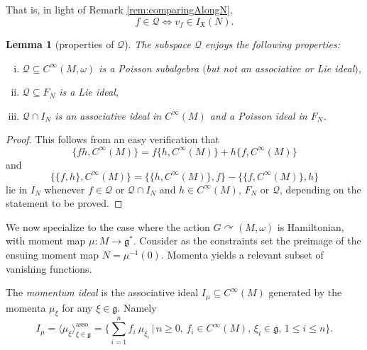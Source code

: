 \documentclass[pdftex]{sigma}
\numberwithin{equation}{section}
\newtheorem{Lemma}[Theorem]{Lemma}
\DeclareMathOperator{\action}{\curvearrowright}
\newcommand{\g}{\mathfrak{g}}
\newcommand{\X}{\mathfrak{X}}
\renewcommand{\subset}{\subseteq}
\begin{document}
That is, in light of Remark \ref{rem:comparingAlongN},
\[
	f \in \mathcal{Q} \iff v_f\in I_\X(N).
\]

\begin{Lemma}[properties of $\mathcal{Q}$]\label{lem:Qproperties}
	The subspace $\mathcal{Q}$ enjoys the following properties:
	\begin{enumerate}[i.]\itemsep=0pt
		\item[$(i)$] $\mathcal{Q}\subset C^\infty(M,\omega)$ is a Poisson subalgebra $($but not an associative or Lie ideal$)$,
		\item[$(ii)$] $\mathcal{Q}\subset F_N$ is a Lie ideal,
		\item[$(iii)$] $\mathcal{Q}\cap I_N$ is an associative ideal in $C^\infty(M)$ and a Poisson ideal in $F_N$.		
	\end{enumerate}
\end{Lemma}

\begin{proof}
	This follows from an easy verification that
	\[
		\{fh,C^\infty(M)\} = f\{h,C^\infty(M)\} + h\{f,C^\infty(M)\}
	\]
	and
	\[
		\{\{f,h\},C^\infty(M)\} = \{\{h,C^\infty(M)\},f\}- \{\{f,C^\infty(M)\},h\}
	\]
	lie in $I_N$ whenever $f\in\mathcal{Q}$ or $\mathcal{Q}\cap I_N$ and $h\in C^\infty(M)$, $F_N$ or $\mathcal{Q}$, depending on the statement to be proved.
\end{proof}

We now specialize to the case where the action $G\action (M,\omega)$ is Hamiltonian, with moment map $\mu\colon M\to \g^*$.  Consider as the constraints set the preimage of the ensuing moment map $N=\mu^{-1}(0)$.
Momenta yields a relevant subset of vanishing functions.

\begin{Definition}\label{def:momentumideal}
	The \emph{momentum ideal} is the associative ideal $I_\mu\subset C^\infty(M)$ generated by the momenta $\mu_{\xi}$ for any $\xi\in \mathfrak{g}$.
	Namely
	\[
		I_\mu
		=
		\langle \mu_\xi \rangle_{\xi \in \mathfrak{g}}^{\text{asso}}
		=
		\Biggl\{
				\sum_{i=1}^n f_i ~ \mu_{\xi_i}
			\,\Bigg|\,
				n\geq0,\, f_i \in C^\infty(M),\, \xi_i\in \mathfrak{g},\,  1 \leq i \leq n
		\Biggr\}
		.
	\]
\end{Definition}
\end{document}

